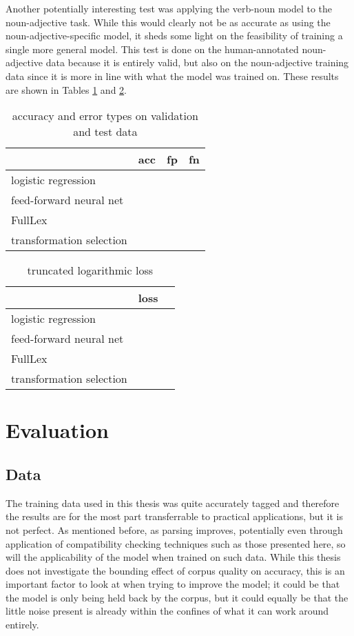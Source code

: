 \documentclass[a4paper, 11pt]{scrartcl}
\begin{document}
Another potentially interesting test was applying the verb-noun model to the noun-adjective task. While this would clearly not be as accurate as using the noun-adjective-specific model, it sheds some light on the feasibility of training a single more general model. This test is done on the human-annotated noun-adjective data because it is entirely valid, but also on the noun-adjective training data since it is more in line with what the model was trained on. These results are shown in Tables \ref{accuracy-vn-na} and \ref{loss-vn-na}.

\begin{table}[]
	\centering
	\begin{tabular}{l|lll}
		                         & acc      & fp       & fn        \\ \hline
		logistic regression      &          &          &           \\
		feed-forward neural net  &          &          &           \\
		FullLex                  &          &          &           \\
		transformation selection &          &          &
	\end{tabular}
	\caption{accuracy and error types on validation and test data}
	\label{accuracy-vn-na}
\end{table}

\begin{table}[]
	\centering
	\begin{tabular}{l|l|l}
		                         & loss      \\ \hline
		logistic regression      &           \\
		feed-forward neural net  &           \\
		FullLex                  &           \\
		transformation selection &
	\end{tabular}
	\caption{truncated logarithmic loss}
	\label{loss-vn-na}
\end{table}


\section{Evaluation}

\subsection{Data}
The training data used in this thesis was quite accurately tagged and therefore the results are for the most part transferrable to practical applications, but it is not perfect. As mentioned before, as parsing improves, potentially even through application of compatibility checking techniques such as those presented here, so will the applicability of the model when trained on such data. While this thesis does not investigate the bounding effect of corpus quality on accuracy, this is an important factor to look at when trying to improve the model; it could be that the model is only being held back by the corpus, but it could equally be that the little noise present is already within the confines of what it can work around entirely.
\end{document}
